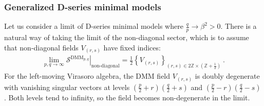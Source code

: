 \documentclass[12pt, a4paper]{article}
\begin{document}
\subsubsection{Generalized D-series minimal models}\label{sec:gdmm}

Let us consider a limit of D-series minimal models where $\frac{q}{p}\to \beta^2>0$. There is a natural way of taking the limit of the non-diagonal sector, which is to assume that non-diagonal fields $V_{(r,s)}$ have fixed indices:
\begin{align}
 \lim_{p,q\to\infty} \left. \mathcal{S}^{\text{DMM}_{p,q}} \right|_{\text{non-diagonal}} = 
 \frac12\left\{V_{(r,s)} \right\}_{ (r,s)\in 2\mathbb{Z}\times (\mathbb{Z}+\frac12)}\ .
\end{align}
For the left-moving Virasoro algebra, the DMM field $V_{(r,s)}$ is doubly degenerate with vanishing singular vectors at levels $(\frac{p}{2}+r)(\frac{q}{2}+s)$ and $(\frac{p}{2}-r)(\frac{q}{2}-s)$. Both levels tend to infinity, so the field becomes non-degenerate in the limit.
\end{document}
